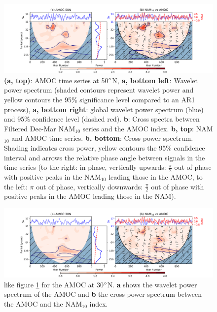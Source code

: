 \begin{center}
\begin{figure}[h!]
\noindent\includegraphics[width = \linewidth]{Figures/Figures-surface/AMOC_NAM_filtered_subplot.png}
\caption[Wavelet power spectrum of the AMOC at 50$\degree$N and cross spectrum with the NAM$_{10}$ index]{\textbf{(a, top)}: AMOC time series at 50$\degree$N, \textbf{a, bottom left}: Wavelet power spectrum (shaded contours represent wavelet power and yellow contours the 95\% significance level compared to an AR1 process), \textbf{a, bottom right}: global wavelet power spectrum (blue) and 95\% confidence level (dashed red). \textbf{b}: Cross spectra between Filtered Dec-Mar NAM$_{10}$ series and the AMOC index. \textbf{b, top}: NAM$_{10}$ and AMOC time series. \textbf{b, bottom}: Cross power spectrum. Shading indicates cross power, yellow contours the 95\% confidence interval and arrows the relative phase angle between signals in the time series (to the right: in phase, vertically upwards: $\frac{\pi}{2}$ out of phase with positive peaks in the NAM$_{10}$ leading those in the AMOC, to the left: $\pi$ out of phase, vertically downwards: $\frac{\pi}{2}$ out of phase with positive peaks in the AMOC leading those in the NAM).}
\label{NAM_AMOC_Cross}
\end{figure}
\end{center}

\begin{center}
\begin{figure}[h!]
\noindent\includegraphics[width = \linewidth]{Figures/Figures-surface/AMOC_NAM_filtered_subplot_30N.png}
\caption[Wavelet power spectrum of the AMOC at 30$\degree$N and cross spectrum with the NAM$_{10}$ index]{like figure \ref{NAM_AMOC_Cross} for the AMOC at 30$\degree$N. \textbf{a} shows the wavelet power spectrum of the AMOC and \textbf{b} the cross power spectrum between the AMOC and the NAM$_{10}$ index.}
\label{NAM_AMOC_Cross_30}
\end{figure}
\end{center}

